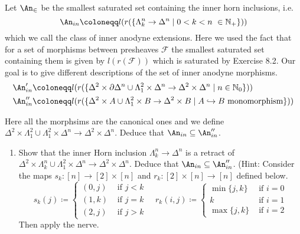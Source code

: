 \begin{Exercise}
	Let $ \An_{ \in } $ be the smallest saturated set containing the inner horn inclusions, i.e.
	\[
	\An_{ in } \coloneqq l ( r ( \{ \Lambda_k^n \to \Delta^n \mid 0 < k < n \ \in \mathbb{ N }_+ \} ) ) 
	\]
	which we call the class of inner anodyne extensions.
	Here we used the fact that for a set of morphisms between presheaves $ \mathcal{ F } $ the smallest saturated set containing them is given by $ l ( r ( \mathcal{ F } ) ) $ which is saturated by Exercise 8.2.
	Our goal is to give different descriptions of the set of inner anodyne morphisms.
	\begin{align*}
		\An'_{ in }
		&\coloneqq 
		l ( r ( \{ \Delta^2 \times \partial \Delta^n \cup \Lambda_1^2 \times \Delta^n \to \Delta^2 \times \Delta^n \mid n \in \mathbb{ N }_0 \} ) ) 
		\\
		\An''_{ in }
		&\coloneqq 
		l ( r ( \{ \Delta^2 \times A \cup \Lambda_1^2 \times B \to \Delta^2 \times B \mid A \hookrightarrow B \text{ monomorphism} \} ) ) 
	\end{align*}
	
	Here all the morphsims are the canonical ones and we define $ \Delta^2  \times \Lambda_1^2 \cup \Lambda_1^2 \times \Delta^n \to \Delta^2 \times \Delta^n $.
	Deduce that $ \An_{ in } \subseteq \An''_{ in } $.
	\begin{enumerate}[label=(\alph*)]
		\item 
		Show that the inner Horn inclusion $ \Lambda_k^n \to \Delta^n $ is a retract of $ \Delta^2 \times \Lambda_k^n \cup \Lambda_1^2 \times \Delta^n \to \Delta^2 \times \Delta^n. $
		Deduce that $ \An_{ in } \subseteq \An_{ in }'' $.
		\newline
		(Hint: Consider the maps $s_k \colon \left[ n \right] \to \left[ 2 \right] \times \left[ n \right] $ and $ r_k \colon \left[ 2 \right] \times \left[ n \right] \to \left[ n \right] $ defined below.
		\[
		s_k ( j ) 
		\coloneqq
		\begin{cases}
			( 0 , j ) & \text{ if } j < k 
			\\
			( 1 , k ) & \text{ if } j = k 
			\\
			( 2 , j ) & \text{ if } j > k 
		\end{cases}
		\quad
		r_k ( i , j ) 
		\coloneqq
		\begin{cases}
			\min \{ j , k \} & \text{ if } i = 0
			\\
			k & \text{ if } i = 1
			\\
			\max \{ j , k \} & \text{ if } i = 2 
		\end{cases}
		\]
		Then apply the nerve.
		

\end{enumerate}
\end{Exercise}
